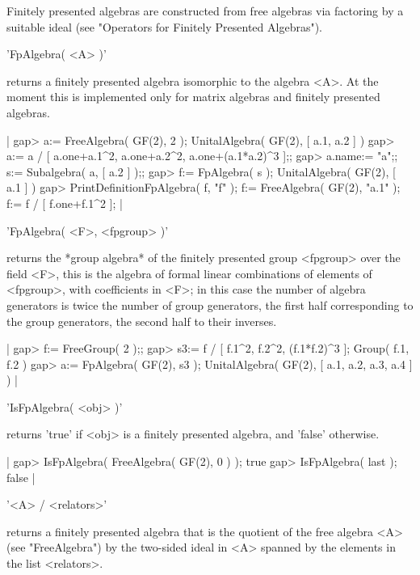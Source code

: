 Finitely presented algebras are constructed from free algebras via factoring
by a suitable ideal (see "Operators for Finitely Presented Algebras").


'FpAlgebra( <A> )'

returns a finitely presented algebra isomorphic to the
algebra <A>.  At the moment this is implemented only for matrix algebras
and finitely presented algebras.

|    gap> a:= FreeAlgebra( GF(2), 2 );
    UnitalAlgebra( GF(2), [ a.1, a.2 ] )
    gap> a:= a / [ a.one+a.1^2, a.one+a.2^2, a.one+(a.1*a.2)^3 ];;
    gap> a.name:= "a";; s:= Subalgebra( a, [ a.2 ] );;
    gap> f:= FpAlgebra( s );
    UnitalAlgebra( GF(2), [ a.1 ] )
    gap> PrintDefinitionFpAlgebra( f, "f" );
    f:= FreeAlgebra( GF(2), "a.1" );
    f:= f / [ f.one+f.1^2 ]; |
    
\vspace{5mm}

'FpAlgebra( <F>, <fpgroup> )'

returns the *group algebra* of the finitely presented group <fpgroup> over
the field  <F>, this is the algebra of formal linear combinations of
elements of <fpgroup>, with coefficients in <F>; in this case the number of
algebra generators is twice the number of group generators, the first half
corresponding to the group generators, the second half to their inverses.

|    gap> f:= FreeGroup( 2 );;
    gap> s3:= f / [ f.1^2, f.2^2, (f.1*f.2)^3 ];
    Group( f.1, f.2 )
    gap> a:= FpAlgebra( GF(2), s3 );
    UnitalAlgebra( GF(2), [ a.1, a.2, a.3, a.4 ] ) |


'IsFpAlgebra( <obj> )'

returns 'true' if <obj> is a finitely presented algebra,
and 'false' otherwise.

|    gap> IsFpAlgebra( FreeAlgebra( GF(2), 0 ) );
    true
    gap> IsFpAlgebra( last );
    false |


'<A> / <relators>'

returns a finitely presented algebra that is the quotient of the free algebra
<A> (see "FreeAlgebra") by the two-sided ideal in <A> spanned by the elements
in the list <relators>.

